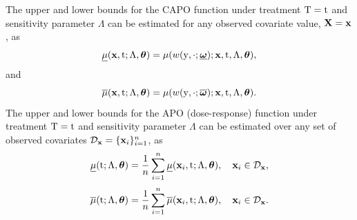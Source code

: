 The upper and lower bounds for the CAPO function under treatment $\mathrm{T}=\mathrm{t}$ and sensitivity parameter $\Lambda$ can be estimated for any observed covariate value, $\mathbf{X}=\mathbf{x}$, as
\begin{equation*}
    \underline{\mu}(\mathbf{x}, \mathrm{t}; \Lambda, \bm{\theta}) = \mu(w(\mathrm{y}, \cdot; \underline{\bm{\omega}}); \mathbf{x}, \mathrm{t}, \Lambda, \bm{\theta}),
\end{equation*}
and
\begin{equation*}
    \overline{\mu}(\mathbf{x}, \mathrm{t}; \Lambda, \bm{\theta}) = \mu(w(\mathrm{y}, \cdot; \overline{\bm{\omega}}); \mathbf{x}, \mathrm{t}, \Lambda, \bm{\theta}).
\end{equation*}
The upper and lower bounds for the APO (dose-response) function under treatment $\mathrm{T}=\mathrm{t}$ and sensitivity parameter $\Lambda$ can be estimated over any set of observed covariates $\mathcal{D}_{\mathbf{x}} = \{\mathbf{x}_i\}_{i=1}^n$, as
\begin{equation*}
    \underline{\mu}(\mathrm{t}; \Lambda, \bm{\theta}) = \frac{1}{n} \sum_{i = 1}^{n} \underline{\mu}(\mathbf{x}_i, \mathrm{t}; \Lambda, \bm{\theta}), \quad \mathbf{x}_i \in \mathcal{D}_{\mathbf{x}},
\end{equation*}
\begin{equation*}
    \overline{\mu}(\mathrm{t}; \Lambda, \bm{\theta}) = \frac{1}{n} \sum_{i = 1}^{n} \overline{\mu}(\mathbf{x}_i, \mathrm{t}; \Lambda, \bm{\theta}), \quad \mathbf{x}_i \in \mathcal{D}_{\mathbf{x}}.
\end{equation*}
